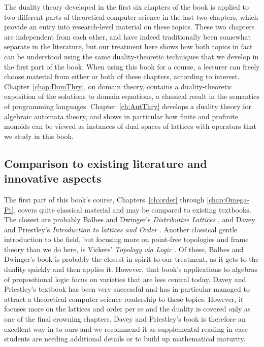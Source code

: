 The duality theory developed in the first six chapters of the book is applied to two different parts of theoretical computer science in the last two chapters, which provide an entry into research-level material on these topics. These two chapters are independent from each other, and have indeed traditionally been somewhat separate in the literature, but our treatment here shows how both topics in fact can be understood using the same duality-theoretic techniques that we develop in the first part of the book. When using this book for a course, a lecturer can freely choose material from either or both of these chapters, according to interest. Chapter~\ref{chap:DomThry}, on domain theory, contains a duality-theoretic exposition of the solutions to domain equations, a classical result in the semantics of programming languages. Chapter~\ref{ch:AutThry} develops a duality theory for algebraic automata theory, and shows in particular how finite and profinite monoids can be viewed as instances of dual spaces of lattices with operators that we study in this book.

\subsection*{Comparison to existing literature and innovative aspects}
The first part of this book's course, Chapters~\ref{ch:order} through \ref{chap:Omega-Pt}, covers quite classical material and may be compared to existing textbooks. The closest are probably Balbes and Dwinger's \emph{Distributive Lattices} \cite{BalDwi1974}, and Davey and Priestley's \emph{Introduction to lattices and Order} \cite{DavPri2002}.  Another classical gentle introduction to the field, but focusing more on point-free topologies and frame theory than we do here, is Vickers' \emph{Topology via Logic} \cite{Vic1989}.   Of these, Balbes and Dwinger's book \cite{BalDwi1974} is probably the closest in spirit to our treatment, as it gets to the duality quickly and then applies it.
However, that book's applications to algebras of propositional logic focus on varieties that are less central today. Davey and Priestley's textbook \cite{DavPri2002} has been very successful and has in particular managed to attract a theoretical computer science readership to these topics. However, it focuses more on the lattices and order per se and the duality is covered only as one of the final crowning chapters. Davey and Priestley's book is therefore an excellent way in to ours and we recommend it as supplemental reading in case students are needing additional details or to build up mathematical maturity.

